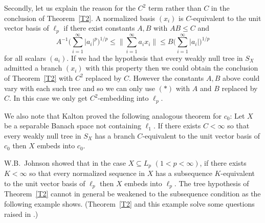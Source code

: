 \documentclass[11pt,leqno]{amsart}
\theoremstyle{definition}
\begin{document}
Secondly, let us explain the reason for the $C^2$ term rather than $C$ in 
the conclusion of Theorem~\ref{T2}. 
A normalized basis $(x_i)$ is $C$-equivalent to the unit vector basis of 
$\ell_p$ if there exist constants $A,B$ with $AB \le C$ and 
\begin{equation*}
A^{-1} \biggl( \sum_{i=1}^\infty |a_i|^p\biggr)^{1/p}
\le \Big\| \sum_{i=1}^\infty a_ix_i\Big\| 
\le B\biggl( \sum_{i=1}^\infty |a_i|\biggr)^{1/p}
\tag{$*$}
\end{equation*}
for all scalars $(a_i)$. 
If we had the hypothesis that every weakly null tree in $S_X$ admitted 
a branch $(x_i)$ with this property then we could obtain the conclusion 
of Theorem~\ref{T2} with $C^2$ replaced by $C$. 
However the constants $A,B$ above could vary with each such tree and 
so we can only use $(*)$ with $A$ and $B$ replaced by $C$. 
In this case we only get  $C^2$-embedding into $\ell_p$. 



We also note that Kalton \cite{K} proved the following analogous theorem 
for $c_0$: 
Let $X$ be a separable Banach space not containing $\ell_1$. 
If there exists $C<\infty$ so that every weakly null tree in $S_X$ has a 
branch $C$-equivalent to the unit vector basis of $c_0$ then $X$ embeds 
into $c_0$. 

W.B.~Johnson \cite{J2} showed that in the case $X\subseteq L_p$ $(1<p<\infty)$,
if there exists $K<\infty$ so that every normalized sequence in $X$ has a 
subsequence $K$-equivalent to the unit vector basis of $\ell_p$ then $X$ 
embeds into $\ell_p$. 
The tree hypothesis of Theorem~\ref{T2} cannot in general be weakened to the 
subsequence condition as the following example shows. 
(Theorem~\ref{T2} and this example solve some questions raised in 
\cite{J2}.) 
\end{document}
